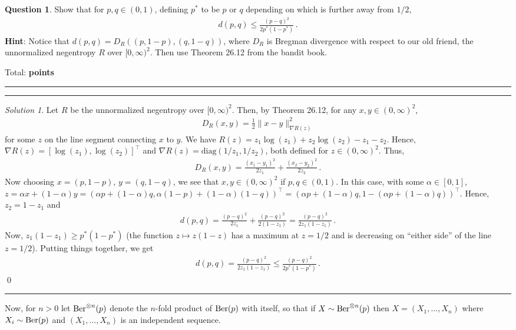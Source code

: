 \documentclass{article}
\DeclareMathOperator*{\1}{\mathbbm{1}}
\newcommand{\0}{\mathbf{0}}
\newcounter{DocPoints} %
\newcounter{QuestionPoints} %
\newcommand{\tpoints}[1]{        %
	\ifthenelse{\isempty{#1}}%
	{%
	}%
	{%
		\addtocounter{DocPoints}{#1}
		\addtocounter{QuestionPoints}{#1}
	}													 %
	\par\mbox{}\par\noindent\hfill {Total: \bf \arabic{QuestionPoints}\xspace points}\par\mbox{}\par\hrule\hrule
	\setcounter{QuestionPoints}{0}
}
\theoremstyle{definition}
\newtheorem{question}{Question}
\theoremstyle{remark}
\newtheorem*{solution*}{Solution}
\theoremstyle{theorem}
\newcommand{\hint}{\noindent \textbf{Hint}:\xspace}
\begin{document}
\begin{question}
\label{q:ber}
Show that for $p,q\in (0,1)$, defining $p^*$ to be $p$ or $q$ depending on which is further away from $1/2$,
\begin{align}
d(p,q) \le \frac{(p-q)^2}{2p^*(1-p^*)}\,.
\label{eq:dpq}
\end{align}
\hint 
Notice that $d(p,q)=D_R( (p,1-p), (q,1-q))$, where $D_R$ is Bregman divergence with respect to our old friend, the unnormalized negentropy $R$ over $[0,\infty)^2$. Then use Theorem 26.12 from the bandit book.
\tpoints{20}
\end{question}
\begin{solution*}
Let $R$ be the unnormalized negentropy over $[0,\infty)^2$. Then, by Theorem 26.12, for any $x,y\in (0,\infty)^2$,
\begin{align*}
D_R(x,y) = \frac{1}{2}\| x- y\|_{\nabla R(z)}^2
\end{align*}
for some $z$ on the line segment connecting $x$ to $y$.
We have $R(z) = z_1 \log(z_1) + z_2 \log(z_2) - z_1 - z_2$. Hence, $\nabla R(z) = [\log(z_1),\log(z_2)]^\top$ and $\nabla R(z) = \text{diag}(1/z_1,1/z_2)$, both defined for $z\in (0,\infty)^2$.
Thus,
\begin{align*}
D_R(x,y) = \frac{(x_1-y_1)^2}{2 z_1} + \frac{(x_2-y_2)^2}{2 z_2}\,.
\end{align*}
Now choosing $x=(p,1-p)$, $y=(q,1-q)$, we see that $x,y\in (0,\infty)^2$ if $p,q\in (0,1)$.
In this case, with some $\alpha\in [0,1]$,
 $z = \alpha x + (1-\alpha) y 
= (\alpha p + (1-\alpha) q,  \alpha(1-p)+(1-\alpha)(1-q))^\top
= (\alpha p + (1-\alpha) q,  1-(\alpha p+(1-\alpha)q) )^\top$.
Hence, $z_2 = 1-z_1$ and
\begin{align*}
d(p,q) = \frac{(p-q)^2}{2z_1} + \frac{(p-q)^2}{2(1-z_1)} = \frac{(p-q)^2}{2 z_1(1-z_1)}\,.
\end{align*}
Now, $z_1(1-z_1)\ge p^*(1-p^*)$ (the function $z\mapsto z(1-z)$ has a maximum at $z=1/2$ and is decreasing on ``either side'' of the line $z=1/2$).
Putting things together, we get 
\begin{align*}
d(p,q) = \frac{(p-q)^2}{2 z_1(1-z_1)} \le \frac{(p-q)^2}{2 p^*(1-p^*)}\,.
\end{align*}
\qed\par\smallskip\hrule
\end{solution*}

Now, for $n>0$ let $\text{Ber}^{\otimes n}(p)$ denote the $n$-fold product of $\text{Ber}(p)$ with itself, 
so that if $X\sim \text{Ber}^{\otimes n}(p)$ then $X = (X_1,\dots,X_n)$ where $X_i \sim \text{Ber}(p)$ and $(X_1,\dots,X_n)$ is an independent sequence.
\end{document}
